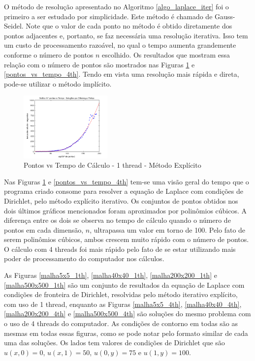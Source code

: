 \documentclass[journal]{IEEEtran}
\begin{document}
O método de resolução apresentado no Algoritmo \ref{algo_laplace_iter} foi o primeiro a ser estudado por simplicidade. Este método é chamado de Gauss-Seidel. Note que o valor de cada ponto no método é obtido diretamente dos pontos adjacentes e, portanto, se faz necessária uma resolução iterativa. Isso tem um custo de processamento razoável, no qual o tempo aumenta grandemente conforme o número de pontos $n$ escolhido. Os resultados que mostram essa relação com o número de pontos são mostrados nas Figuras \ref{pontos_vs_tempo_1th} e \ref{pontos_vs_tempo_4th}. Tendo em vista uma resolução mais rápida e direta, pode-se utilizar o método implícito.

\begin{figure}[ht!]
\centering
\includegraphics[width = 0.4\textwidth]{figures/problema01_m1/03.png}
\caption{Pontos vs Tempo de Cálculo - 1 thread - Método Explícito\label{pontos_vs_tempo_1th}}
\end{figure}

Nas Figuras \ref{pontos_vs_tempo_1th} e \ref{pontos_vs_tempo_4th} tem-se uma visão geral do tempo que o programa criado consome para resolver a equação de Laplace com condições de Dirichlet, pelo método explícito iterativo. Os conjuntos de pontos obtidos nos dois últimos gráficos mencionados foram aproximados por polinômios cúbicos. A diferença entre os dois se observa no tempo de cálculo quando o número de pontos em cada dimensão, $n$, ultrapassa um valor em torno de 100. Pelo fato de serem polinômios cúbicos, ambos crescem muito rápido com o número de pontos. O cálculo com 4 threads foi mais rápido pelo fato de se estar utilizando mais poder de processamento do computador nos cálculos.

As Figuras \ref{malha5x5_1th}, \ref{malha40x40_1th}, \ref{malha200x200_1th} e \ref{malha500x500_1th} são um conjunto de resultados da equação de Laplace com condições de fronteira de Dirichlet, resolvidas pelo método iterativo explícito, com uso de 1 thread, enquanto as Figuras \ref{malha5x5_4th}, \ref{malha40x40_4th}, \ref{malha200x200_4th} e \ref{malha500x500_4th} são soluções do mesmo problema com o uso de 4 threads do computador. As condições de contorno em todas são as mesmas em todas essas figuras, como se pode notar pelo formato similar de cada uma das soluções. Os lados tem valores de condições de Dirichlet que são $u(x,0)=0$, $u(x,1)=50$, $u(0,y)=75$ e $u(1,y)=100$. 
\end{document}
